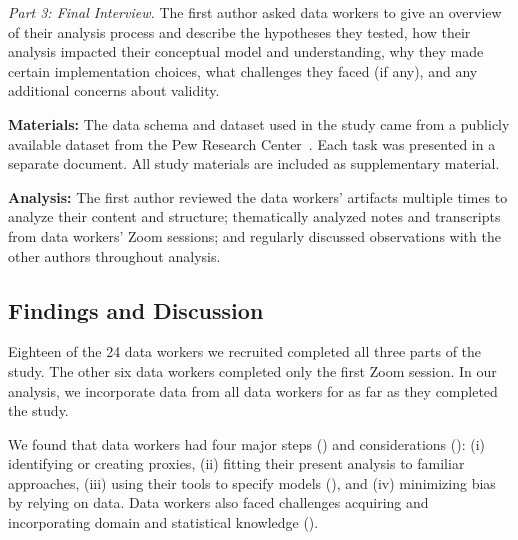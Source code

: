 \textit{Part 3: Final Interview.} The first author asked data workers to give an
overview of their analysis process and describe the hypotheses they tested, how
their analysis impacted their conceptual model and understanding, why they made
certain implementation choices, what challenges they faced (if any), and any
additional concerns about validity.

\noindent\textbf{Materials:} The data schema and dataset used in the study came from a
publicly available dataset from the Pew Research Center~\cite{pewDataset}. Each
task was presented in a separate document. All study materials are included as
supplementary material.

\noindent\textbf{Analysis:} The first author reviewed the data workers' artifacts multiple
times to analyze their content and structure;
thematically analyzed notes and transcripts from data workers' Zoom sessions;
and regularly discussed observations with the other authors throughout analysis.

\subsection{Findings and Discussion} 


Eighteen of the 24 data workers we recruited completed all three parts of the study.
The other six data workers completed only the first Zoom session. In our analysis,
we incorporate data from all data workers for as far as they completed the study. 

We found that data workers had four major steps (\rqSteps) and considerations
(\rqProcess): (i) identifying or creating proxies, (ii) fitting their present
analysis to familiar approaches, (iii) using their tools to specify models
(\rqTools), and (iv) minimizing bias by relying on data. Data workers also faced
challenges acquiring and incorporating domain and statistical knowledge
(\rqProcess).

